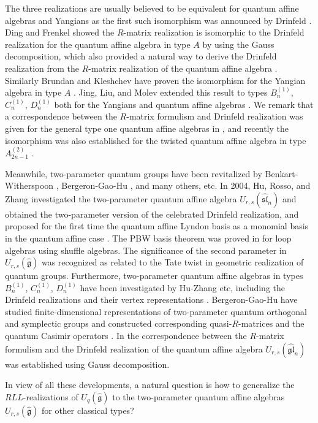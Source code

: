 \documentclass[10pt,a4paper]{amsart}
\numberwithin{equation}{section}
\begin{document}
The three realizations are usually believed to be equivalent for quantum affine algebras and Yangians as the first such isomorphism was announced
by Drinfeld \cite{D}. Ding and Frenkel showed the $R$-matrix realization is isomorphic to the Drinfeld realization for the quantum affine algebra in type $A$ by using the Gauss decomposition, which also provided a natural way to derive the Drinfeld realization from the $R$-matrix
realization of the quantum affine algebra \cite{DF}. Similarly Brundan and Kleshchev have proven the isomorphism for the Yangian algebra
 in type $A$ \cite{BK}.
 Jing, Liu, and Molev extended this result to types $B_n^{(1)}$, $C_n^{(1)}$, $D_n^{(1)}$ both for the Yangians and quantum affine algebras
 \cite{JLM1, JLM2, JLM3}. We remark that a correspondence between the $R$-matrix formulism and Drinfeld realization was given for the general type one quantum affine algebras in \cite{HM}, and recently
 the isomorphism was also established for the twisted quantum affine algebra in type $A_{2n-1}^{(2)}$ \cite{JZL}.

Meanwhile, two-parameter quantum groups have been revitalized by Benkart-Witherspoon \cite{BW2}, Bergeron-Gao-Hu \cite{BGH1}, and many others, etc. In 2004, Hu, Rosso, and Zhang investigated the two-parameter quantum affine algebra $U_{r, s}(\widehat{\mathfrak{sl}}_n)$ and obtained the
two-parameter version of the celebrated Drinfeld realization, and proposed for the first time the quantum affine Lyndon basis as a monomial basis in the quantum affine case \cite{HRZ}. The PBW basis theorem was proved in \cite{Ts} for loop algebras using shuffle algebras. 
The significance of the second parameter in $U_{r, s}(\widehat{\mathfrak{g}})$ was recognized \cite{FL} as related to the Tate twist in geometric realization of quantum groups. Furthermore, two-parameter quantum affine algebras in types $B_n^{(1)}$, $C_n^{(1)}$, $D_n^{(1)}$ have been investigated by Hu-Zhang etc, including the Drinfeld realizations and their vertex representations \cite{HZ}.
Bergeron-Gao-Hu have studied finite-dimensional representations of two-parameter quantum orthogonal and symplectic groups and constructed corresponding quasi-$R$-matrices and the quantum Casimir operators \cite{BGH2}. In \cite{JL2} the correspondence between
the $R$-matrix formulism and the Drinfeld realization of the quantum affine algebra
$U_{r, s}(\widehat{\mathfrak{gl}}_n)$ was established using Gauss decomposition.

In view of all these developments, a natural question is how to generalize the $RLL$-realizations of $U_q(\hat{\mathfrak g})$ to the two-parameter quantum affine algebras $U_{r,s}(\hat{\mathfrak{g}})$ for other classical types?
\end{document}
